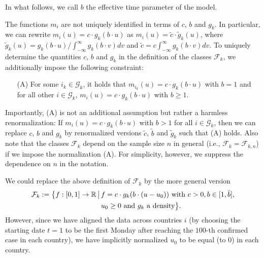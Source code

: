 \documentclass[a4paper,12pt]{article}
\numberwithin{equation}{section}
\begin{document}
In what follows, we call $b$ the effective time parameter of the model. 


\begin{remark}
The functions $m_i$ are not uniquely identified in terms of $c$, $b$ and $g_k$. In particular, we can rewrite $m_i(u) = c \cdot g_k(b \cdot u)$ as $m_i(u) = \tilde{c} \cdot \tilde{g}_k(u)$, where $\tilde{g}_k(u) = g_k(b \cdot u) / \int_{-\infty}^\infty g_k(b \cdot v) dv$ and $\tilde{c} = c \int_{-\infty}^\infty g_k(b \cdot v) dv$. To uniquely determine the quantities $c$, $b$ and $g_k$ in the definition of the classes $\mathcal{F}_k$, we additionally impose the following constraint: 
\begin{itemize}[leftmargin=0.75cm]
\item[(A)] For some $i_k \in \mathcal{G}_k$, it holds that $m_{i_k}(u) = c \cdot g_k(b \cdot u)$ with $b = 1$ and for all other $i \in \mathcal{G}_k$, $m_i(u) = c \cdot g_k(b \cdot u)$ with $b \ge 1$. 
\end{itemize}
Importantly, (A) is not an additional assumption but rather a harmless renormalization: If $m_i(u) = c \cdot g_k(b \cdot u)$ with $b > 1$ for all $i \in \mathcal{G}_k$, then we can replace $c$, $b$ and $g_k$ by renormalized versions $\tilde{c}$, $\tilde{b}$ and $\tilde{g}_k$ such that (A) holds. Also note that the classes $\mathcal{F}_k$ depend on the sample size $n$ in general (i.e., $\mathcal{F}_k = \mathcal{F}_{k,n}$) if we impose the normalization (A). For simplicity, however, we suppress the dependence on $n$ in the notation. 
\end{remark}


\pagebreak 
\begin{remark}\label{rem:classes_def}
We could replace the above definition of $\mathcal{F}_k$ by the more general version 
\begin{align*}
\mathcal{F}_k := \big\{ f:[0, 1] \rightarrow \mathbb{R} \,\big|\, & f = c \cdot g_k(b \cdot (u-u_0)) \text{ with } c>0, b \in [1, \bar{b}], \\ & u_0 \ge 0 \text{ and } g_k \text{ a density} \big\}. 
\end{align*}
However, since we have aligned the data across countries $i$ (by choosing the starting date $t=1$ to be the first Monday after reaching the $100$-th confirmed case in each country), we have implicitly normalized $u_0$ to be equal (to $0$) in each country. 
\end{remark}
\end{document}
